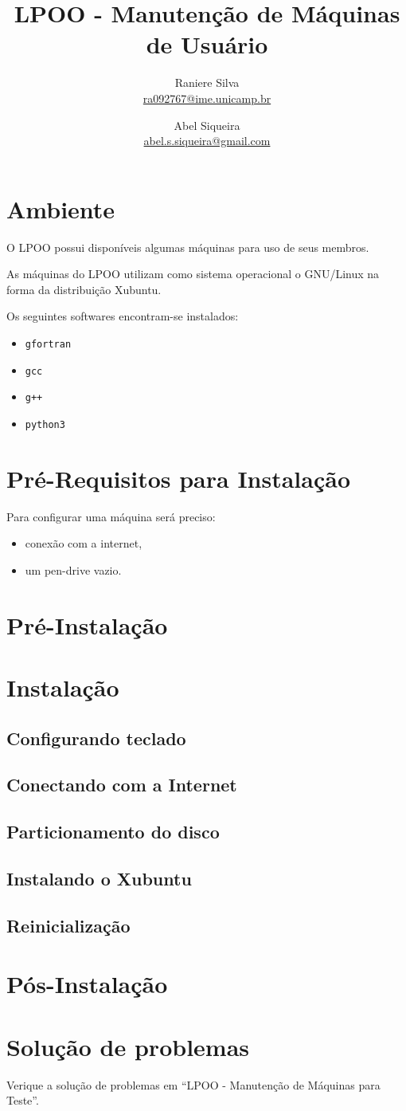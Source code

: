 \documentclass[A4paper]{article}
\title{LPOO - Manutenção de Máquinas de Usuário}
\author{Raniere Silva \\ \url{ra092767@ime.unicamp.br} \and
        Abel Siqueira \\ \url{abel.s.siqueira@gmail.com}}
\begin{document}
\maketitle

\section{Ambiente}
O LPOO possui disponíveis algumas máquinas para uso de seus membros.

As máquinas do LPOO utilizam como sistema operacional o GNU/Linux na forma da
distribuição Xubuntu.

Os seguintes softwares encontram-se instalados:
\begin{itemize}
  \item \lstinline+gfortran+
  \item \lstinline+gcc+
  \item \lstinline!g++!
  \item \lstinline+python3+
\end{itemize}

\section{Pré-Requisitos para Instalação}
Para configurar uma máquina será preciso:
\begin{itemize}
  \item conexão com a internet,
  \item um pen-drive vazio.
\end{itemize}

\section{Pré-Instalação}

\section{Instalação}
\subsection{Configurando teclado}
\subsection{Conectando com a Internet}
\subsection{Particionamento do disco}
\subsection{Instalando o Xubuntu}
\subsection{Reinicialização}

\section{Pós-Instalação}

\section{Solução de problemas}
Verique a solução de problemas em ``LPOO - Manutenção de Máquinas para Teste''.
\end{document}
